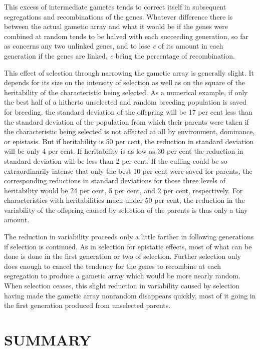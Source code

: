 This excess of intermediate gametes tends to correct itself in subsequent
segregations and recombinations of the genes. Whatever difference
there is between the actual gametic array and what it would be if
the genes were combined at random tends to be halved with each succeeding
generation, so far as concerns any two unlinked genes, and to
lose \textit{c} of its amount in each generation if the genes are linked,
\textit{c} being the percentage of recombination.

This effect of selection through narrowing the gametic array is generally
slight. It depends for its size on the intensity of selection as well
as on the square of the heritability of the characteristic being selected.
As a numerical example, if only the best half of a hitherto unselected
and random breeding population is saved for breeding, the standard
deviation of the offspring will be 17 per cent less than the standard
deviation of the population from which their parents were taken if the
characteristic being selected is not affected at all by environment, dominance,
or epistasis. But if heritability is 50 per cent, the reduction in
standard deviation will be only 4 per cent. If heritability is as low as 30
per cent the reduction in standard deviation will be less than 2 per
cent. If the culling could be so extraordinarily intense that only the
best 10 per cent were saved for parents, the corresponding reductions in
standard deviations for those three levels of heritability would be 24
per cent, 5 per cent, and 2 per cent, respectively. For characteristics with
heritabilities much under 50 per cent, the reduction in the variability
of the offspring caused by selection of the parents is thus only a tiny
amount.

The reduction in variability proceeds only a little farther in following
generations if selection is continued. As in selection for epistatic
effects, most of what can be done is done in the first generation or two of
selection. Further selection only does enough to cancel the tendency
for the genes to recombine at each segregation to produce a gametic
array which would be more nearly random. When selection ceases, this
slight reduction in variability caused by selection having made the
gametic array nonrandom disappears quickly, most of it going in the
first generation produced from unselected parents.

\section*{SUMMARY}

